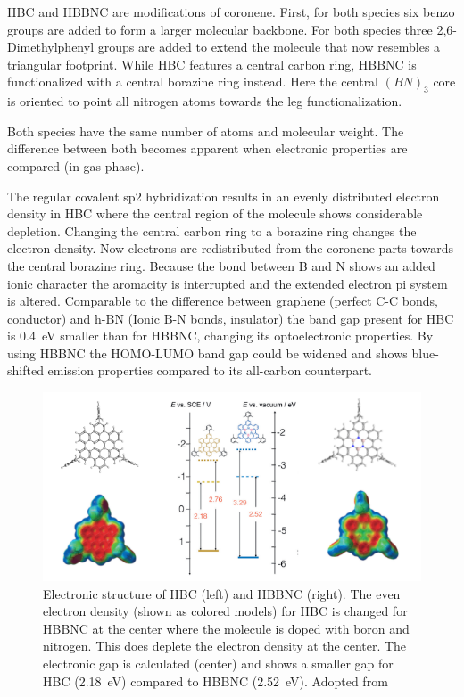 HBC and HBBNC are modifications of coronene. First, for both species six benzo groups are added to form a larger molecular backbone. For both species three 2,6-Dimethylphenyl groups are added to extend the molecule that now resembles a triangular footprint. While HBC features a central carbon ring, HBBNC is functionalized with a central borazine ring instead. Here the central $(BN)_3$ core is oriented to point all nitrogen atoms towards the leg functionalization.

Both species have the same number of atoms and molecular weight. The difference between both becomes apparent when electronic properties are compared (in gas phase).

The regular covalent sp2 hybridization results in an evenly distributed electron density in HBC where the central region of the molecule shows considerable depletion. Changing the central carbon ring to a borazine ring changes the electron density. Now electrons are redistributed from the coronene parts towards the central borazine ring. Because the bond between B and N shows an added ionic character the aromacity is interrupted and the extended electron pi system is altered. Comparable to the difference between graphene (perfect C-C bonds, conductor) and h-BN (Ionic B-N bonds, insulator) the band gap present for HBC is \SI{0.4}{\eV} smaller than for HBBNC, changing its optoelectronic properties. By using HBBNC the HOMO-LUMO band gap could be widened and shows blue-shifted emission properties\cite{dosso_synthesis_2017} compared to its all-carbon counterpart.

\begin{figure}[]\centering
	\includegraphics[width=\textwidth]{./images/dosso-combined}
	\caption{Electronic structure of HBC (left) and HBBNC (right). The even electron density (shown as colored models) for HBC is changed for HBBNC at the center where the molecule is doped with boron and nitrogen. This does deplete the electron density at the center. The electronic gap is calculated (center) and shows a smaller gap for HBC (\SI{2.18}{\eV}) compared to HBBNC (\SI{2.52}{\eV}). Adopted from \cite{dosso_synthesis_2017}}
	\label{}
\end{figure}

